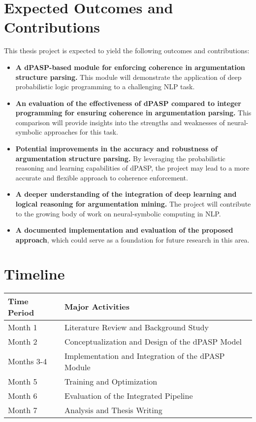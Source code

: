 \documentclass{article}
\begin{document}
\section{Expected Outcomes and Contributions}

This thesis project is expected to yield the following outcomes and
contributions:

\begin{itemize}
    \item \textbf{A dPASP-based module for enforcing coherence in argumentation
    structure parsing.} This module will demonstrate the application of deep
    probabilistic logic programming to a challenging NLP task.
    
    \item \textbf{An evaluation of the effectiveness of dPASP compared to integer
    programming for ensuring coherence in argumentation parsing.} This
    comparison will provide insights into the strengths and weaknesses of
    neural-symbolic approaches for this task.
    
    \item \textbf{Potential improvements in the accuracy and robustness of
    argumentation structure parsing.} By leveraging the probabilistic reasoning
    and learning capabilities of dPASP, the project may lead to a more accurate
    and flexible approach to coherence enforcement.
    
    \item \textbf{A deeper understanding of the integration of deep learning and
    logical reasoning for argumentation mining.} The project will contribute to
    the growing body of work on neural-symbolic computing in NLP.
    
    \item \textbf{A documented implementation and evaluation of the proposed
    approach}, which could serve as a foundation for future research in this
    area.
\end{itemize}

\section{Timeline}

\begin{tabular}{|l|l|}
\hline
\textbf{Time Period} & \textbf{Major Activities} \\
\hline
Month 1 & Literature Review and Background Study \\
\hline
Month 2 & Conceptualization and Design of the dPASP Model \\
\hline
Months 3-4 & Implementation and Integration of the dPASP Module \\
\hline
Month 5 & Training and Optimization \\
\hline
Month 6 & Evaluation of the Integrated Pipeline \\
\hline
Month 7 & Analysis and Thesis Writing \\
\hline
\end{tabular}
\end{document}
